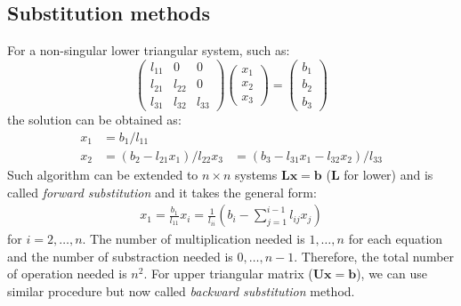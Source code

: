 \documentclass{article}
\begin{document}
\subsection{Substitution methods}
For a non-singular lower triangular system, such as:
\begin{equation}
    \left(\begin{matrix}
        l_{11} & 0 & 0 \\
        l_{21} & l_{22} & 0 \\
        l_{31} & l_{32} & l_{33} 
    \end{matrix}\right)
    \left(\begin{matrix}
        x_1 \\ x_2 \\ x_3
    \end{matrix}\right) = 
    \left(\begin{matrix}
        b_1 \\ b_2 \\ b_3
    \end{matrix}\right)
\end{equation}
the solution can be obtained as:
\begin{align*}
    x_1 &= b_1 / l_{11} \\
    x_2 &= (b_2 - l_{21} x_1 ) / l_{22} 
    x_3 &= (b_3 - l_{31} x_1 - l_{32} x_2) / l_{33}
\end{align*}
Such algorithm can be extended to $n\times n$ systems 
$\mathbf{L}\mathbf{x} = \mathbf{b}$ ($\mathbf{L}$ for lower)
and is called \emph{forward substitution}
and it takes the general form:
\begin{align*}
    x_1 = \frac{b_1}{l_{11}}
    x_i = \frac{1}{l_{ii}} \left(b_i - \sum_{j = 1}^{i-1} l_{ij}x_j\right) 
\end{align*}
for $i = 2, \dots, n$. The number of multiplication needed is $1, \dots, n$ for each 
equation and the number of substraction needed is $0, \dots, n-1$. Therefore, the total 
number of operation needed is $n^2$. 
For upper triangular matrix ($\mathbf{U}\mathbf{x} = \mathbf{b}$), we can use similar procedure but now called 
\emph{backward substitution} method.
\end{document}
